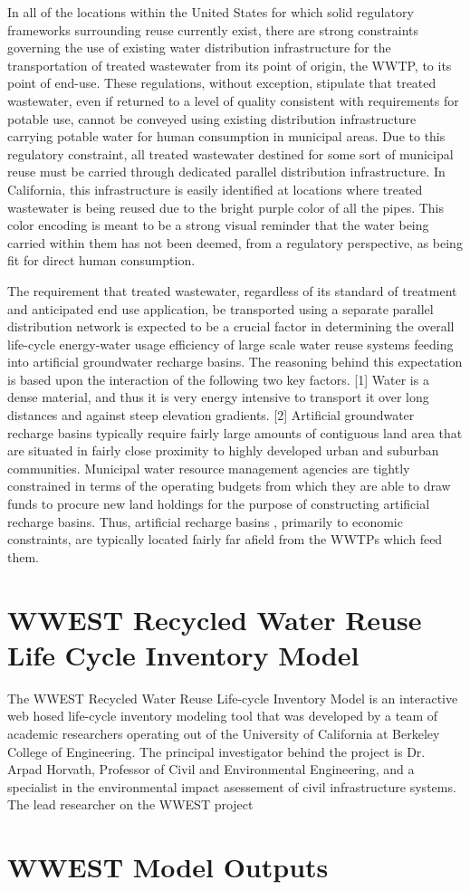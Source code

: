 In all of the locations within the United States for which solid regulatory frameworks surrounding reuse currently exist, there are strong constraints governing the use of existing water distribution infrastructure for the transportation of treated wastewater from its point of origin, the WWTP, to its point of end-use. These regulations, without exception, stipulate that treated wastewater, even if returned to a level of quality consistent with requirements for potable use, cannot be conveyed using existing distribution infrastructure carrying potable water for human consumption in municipal areas. Due to this regulatory constraint, all treated wastewater destined for some sort of municipal reuse must be carried through dedicated parallel distribution infrastructure. In California, this infrastructure is easily identified at locations where treated wastewater is being reused due to the bright purple color of all the pipes. This color encoding is meant to be a strong visual reminder that the water being carried within them has not been deemed, from a regulatory perspective, as being fit for direct human consumption. 

The requirement that treated wastewater, regardless of its standard of treatment and anticipated end use application, be transported using a separate parallel distribution network is expected to be a crucial factor in determining the overall life-cycle energy-water usage efficiency of large scale water reuse systems feeding into artificial groundwater recharge basins. The reasoning behind this expectation is based upon the interaction of the following two key factors. [1] Water is a dense material, and thus it is very energy intensive to transport it over long distances and against steep elevation gradients. [2] Artificial groundwater recharge basins typically require fairly large amounts of contiguous land area that are situated in fairly close proximity to highly developed urban and suburban communities. Municipal water resource management agencies are tightly constrained in terms of the operating budgets from which they are able to draw funds to procure new land holdings for the purpose of constructing artificial recharge basins. Thus, artificial recharge basins , primarily to economic constraints, are typically located fairly far afield from the WWTPs which feed them.
 
\section{WWEST Recycled Water Reuse Life Cycle Inventory Model}

The WWEST Recycled Water Reuse Life-cycle Inventory Model is an interactive web hosed life-cycle inventory modeling tool that was developed by a team of academic researchers operating out of the University of California at Berkeley College of Engineering. The principal investigator behind the project is Dr. Arpad Horvath, Professor of Civil and Environmental Engineering, and a specialist in the environmental impact asessement of civil infrastructure systems. The lead researcher on the WWEST project
\section{WWEST Model Outputs}
